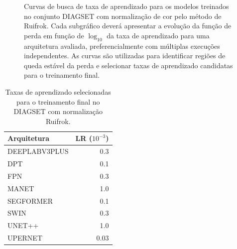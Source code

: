 \begin{figure}[!htb]
\centering


\caption[Curvas de busca de taxa de aprendizado para DIAGSET com Ruifrok]{
Curvas de busca de taxa de aprendizado para os modelos treinados no conjunto
DIAGSET com normalização de cor pelo método de Ruifrok. Cada subgráfico deverá
apresentar a evolução da função de perda em função de $\log_{10}$ da taxa de
aprendizado para uma arquitetura avaliada, preferencialmente com múltiplas
execuções independentes. As curvas são utilizadas para identificar regiões de
queda estável da perda e selecionar taxas de aprendizado candidatas para o
treinamento final.
}
\label{fig:results_diagset-lr-curves-ruifrok}
\end{figure}

\begin{table}[!htb]
\centering
\caption{Taxas de aprendizado selecionadas para o treinamento final no DIAGSET com normalização Ruifrok.}
\label{tab:results_diagset-learning-rates-ruifrok}
\begin{tabular}{lr}
\toprule
Arquitetura & LR ($10^{-3}$) \\
\midrule
DEEPLABV3PLUS & 0.3 \\
DPT & 0.1 \\
FPN & 0.3 \\
MANET & 1.0 \\
SEGFORMER & 0.1 \\
SWIN & 0.3 \\
UNET++ & 1.0 \\
UPERNET & 0.03 \\
\bottomrule
\end{tabular}
\end{table}
